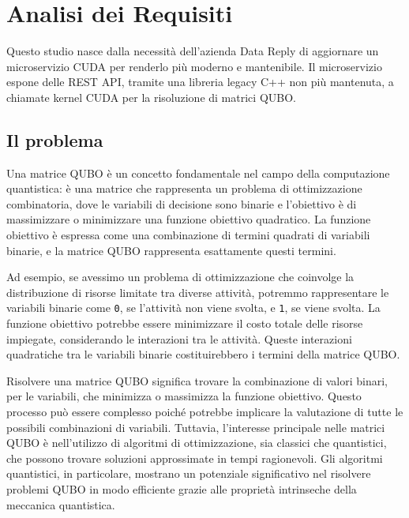 \chapter{Analisi dei Requisiti}
\label{sec:requirements}

Questo studio nasce dalla necessità dell'azienda Data Reply di aggiornare un microservizio \gls{CUDA} per renderlo più moderno e mantenibile. Il microservizio espone delle REST \gls{API}, tramite una libreria legacy C++ non più mantenuta, a chiamate kernel \gls{CUDA} per la risoluzione di matrici \gls{QUBO}.


\section{Il problema}

Una matrice \gls{QUBO} è un concetto fondamentale nel campo della computazione quantistica: è una matrice che rappresenta un problema di ottimizzazione combinatoria, dove le variabili di decisione sono binarie e l'obiettivo è di massimizzare o minimizzare una funzione obiettivo quadratico. La funzione obiettivo è espressa come una combinazione di termini quadrati di variabili binarie, e la matrice \gls{QUBO} rappresenta esattamente questi termini.

Ad esempio, se avessimo un problema di ottimizzazione che coinvolge la distribuzione di risorse limitate tra diverse attività, potremmo rappresentare le variabili binarie come \verb|0|, se l'attività non viene svolta, e \verb|1|, se viene svolta. La funzione obiettivo potrebbe essere minimizzare il costo totale delle risorse impiegate, considerando le interazioni tra le attività. Queste interazioni quadratiche tra le variabili binarie costituirebbero i termini della matrice \gls{QUBO}.

Risolvere una matrice \gls{QUBO} significa trovare la combinazione di valori binari, per le variabili, che minimizza o massimizza la funzione obiettivo. Questo processo può essere complesso poiché potrebbe implicare la valutazione di tutte le possibili combinazioni di variabili. Tuttavia, l'interesse principale nelle matrici \gls{QUBO} è nell'utilizzo di algoritmi di ottimizzazione, sia classici che quantistici, che possono trovare soluzioni approssimate in tempi ragionevoli. Gli algoritmi quantistici, in particolare, mostrano un potenziale significativo nel risolvere problemi \gls{QUBO} in modo efficiente grazie alle proprietà intrinseche della meccanica quantistica.

